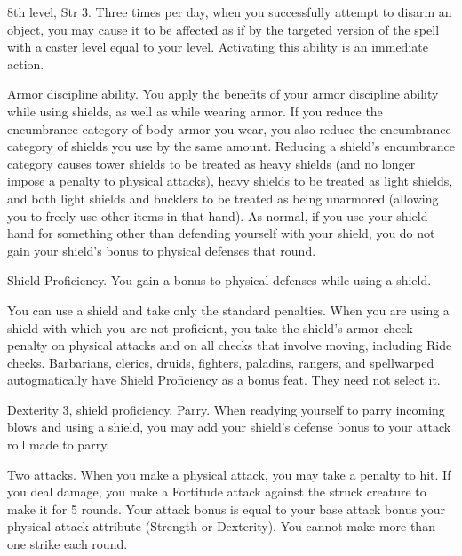 \featpre 8th level, Str 3.
\featben Three times per day, when you successfully attempt to disarm an object, you may cause it to be affected as if by the targeted version of the 
spell with a caster level equal to your level.
Activating this ability is an immediate action.

\featpre Armor discipline ability.
\featben You apply the benefits of your armor discipline ability while using shields, as well as while wearing armor.
If you reduce the encumbrance category of body armor you wear, you also reduce the encumbrance category of shields you use by the same amount.
Reducing a shield's encumbrance category causes tower shields to be treated as heavy shields (and no longer impose a  penalty to physical attacks), heavy shields to be treated as light shields, and both light shields and bucklers to be treated as being unarmored (allowing you to freely use other items in that hand).
As normal, if you use your shield hand for something other than defending yourself with your shield, you do not gain your shield's bonus to physical defenses that round.

\featpre Shield Proficiency.
\featben You gain a  bonus to physical defenses while using a shield.

\featben You can use a shield and take only the standard penalties.
When you are using a shield with which you are not proficient, you take the shield's armor check penalty on physical attacks and on all checks that involve moving, including Ride checks.
Barbarians, clerics, druids, fighters, paladins, rangers, and spellwarped autogmatically have Shield Proficiency as a bonus feat.
They need not select it.

\featpres Dexterity 3, shield proficiency, Parry.
\featben When readying yourself to parry incoming blows and using a shield, you may add your shield's defense bonus to your attack roll made to parry.

\featpre Two attacks.
\featben When you make a physical attack, you may take a  penalty to hit.
If you deal damage, you make a Fortitude attack against the struck creature to make it \sickened for 5 rounds.
Your attack bonus is equal to your base attack bonus \add your physical attack attribute (Strength or Dexterity).
You cannot make more than one strike each round.

